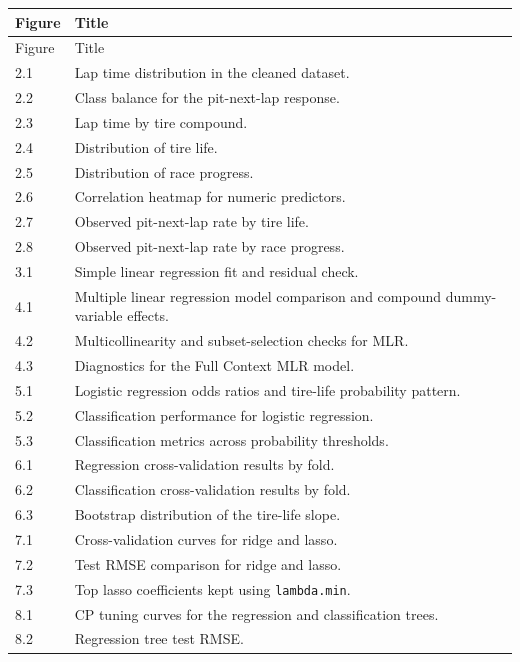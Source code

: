 \documentclass[11pt,oneside,openany]{book}
\begin{document}
\begingroup
\small
\setlength{\tabcolsep}{4pt}
\begin{longtable}{p{}p{}}
\toprule
Figure & Title\\
\midrule
\endfirsthead

\toprule
Figure & Title\\
\midrule
\endhead

\bottomrule
\endlastfoot

2.1 & Lap time distribution in the cleaned dataset.\\
2.2 & Class balance for the pit-next-lap response.\\
2.3 & Lap time by tire compound.\\
2.4 & Distribution of tire life.\\
2.5 & Distribution of race progress.\\
2.6 & Correlation heatmap for numeric predictors.\\
2.7 & Observed pit-next-lap rate by tire life.\\
2.8 & Observed pit-next-lap rate by race progress.\\
3.1 & Simple linear regression fit and residual check.\\
4.1 & Multiple linear regression model comparison and compound dummy-variable effects.\\
4.2 & Multicollinearity and subset-selection checks for MLR.\\
4.3 & Diagnostics for the Full Context MLR model.\\
5.1 & Logistic regression odds ratios and tire-life probability pattern.\\
5.2 & Classification performance for logistic regression.\\
5.3 & Classification metrics across probability thresholds.\\
6.1 & Regression cross-validation results by fold.\\
6.2 & Classification cross-validation results by fold.\\
6.3 & Bootstrap distribution of the tire-life slope.\\
7.1 & Cross-validation curves for ridge and lasso.\\
7.2 & Test RMSE comparison for ridge and lasso.\\
7.3 & Top lasso coefficients kept using \texttt{lambda.min}.\\
8.1 & CP tuning curves for the regression and classification trees.\\
8.2 & Regression tree test RMSE.\\

\end{longtable}
\end{document}
